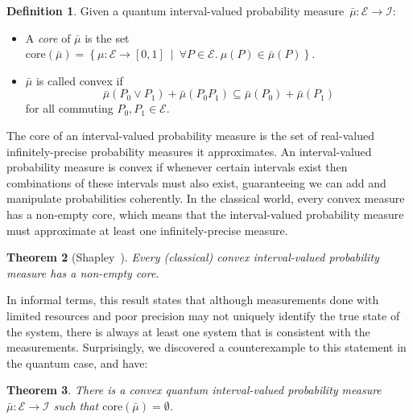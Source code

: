 \documentclass[12pt]{iopart}
\theoremstyle{plain}
\newtheorem{thm}{Theorem}
\theoremstyle{definition}
\newtheorem{definition}[thm]{Definition}
\newcommand{\events}{\ensuremath{\mathcal{E}}}
\newcommand{\pmeas}{\ensuremath{\mu}}
\newcommand{\set}[2]{\ensuremath{\left\{ {#1}~\middle|~{#2}\right\} }}
\begin{document}
\begin{definition} Given a quantum interval-valued probability measure~$\bar{\mu}:\events\rightarrow\mathscr{I}$: 
\begin{itemize}
\item A \emph{core} of $\bar{\mu}$ is the set $\mathrm{core}\left(\bar{\mu}\right)=\set{\pmeas:\events\rightarrow[0,1]}{\forall P\in\events.~\pmeas\left(P\right)\in\bar{\mu}\left(P\right)}$. 
\item $\bar{\mu}$ is called convex if 
\begin{equation}
\bar{\mu}\left(P_{0}\vee P_{1}\right)+\bar{\mu}\left(P_{0}P_{1}\right)\subseteq\bar{\mu}\left(P_{0}\right)+\bar{\mu}\left(P_{1}\right)\label{eq:QuantumInterval-valuedProbability-Convex}
\end{equation}
for all commuting $P_{0},P_{1}\in\events$. 
\end{itemize}
\end{definition}

\noindent The core of an interval-valued probability measure is the
set of real-valued infinitely-precise probability measures it approximates.
An interval-valued probability measure is convex if whenever certain
intervals exist then combinations of these intervals must also exist,
guaranteeing we can add and manipulate probabilities coherently. In
the classical world, every convex measure has a non-empty core, which
means that the interval-valued probability measure must approximate
at least one infinitely-precise measure.

\begin{thm}[Shapley~\cite{Shapley1971,,Grabisch2016}]\label{thm:Shapley}
Every (classical) convex interval-valued probability measure has a
non-empty core. \end{thm}

In informal terms, this result states that although measurements done
with limited resources and poor precision may not uniquely identify
the true state of the system, there is always at least one system
that is consistent with the measurements. Surprisingly, we discovered
a counterexample to this statement in the quantum case, and have:

\begin{thm}\label{def:EmptyCoreQuantumInterval-valuedProbability}
There is a convex quantum interval-valued probability measure~$\bar{\mu}:\events\rightarrow\mathscr{I}$
such that $\mathrm{core}\left(\bar{\mu}\right)=\emptyset$.\end{thm}
\end{document}
